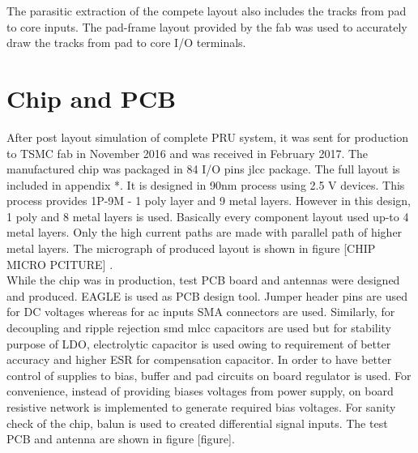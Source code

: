 \documentclass[12pt,a4paper,UKenglish]{article}
\begin{document}
The parasitic extraction of the compete layout also includes the tracks from pad to core inputs. The pad-frame layout provided by the fab was used to accurately draw the tracks from pad to core I/O terminals. \\


\section{Chip and PCB}
After post layout simulation of complete PRU system, it was sent for production to TSMC fab in November 2016 and was received in February 2017. The  manufactured chip was packaged in 84 I/O pins \acrshort{jlcc} package. The full layout is included in appendix *. It is designed in 90nm process using 2.5 V devices. This process provides 1P-9M - 1 poly layer and 9 metal layers. However in this design, 1 poly and 8 metal layers is used. Basically every component layout used up-to 4 metal layers. Only the high current paths are made with parallel path of higher metal layers. The micrograph of produced layout is shown in figure [CHIP MICRO PCITURE] .\\

While the chip was in production, test PCB board and antennas were designed and produced. EAGLE is used as PCB design tool. Jumper header pins are used for DC voltages whereas for ac inputs SMA connectors are used. Similarly, for decoupling and ripple rejection \acrshort{smd} \acrshort{mlcc} capacitors are used but  for stability purpose of LDO, electrolytic capacitor is used owing to requirement of better accuracy and higher ESR for compensation capacitor.  In order to have better control of supplies to bias, buffer and pad circuits on board regulator is used. For convenience, instead of providing biases voltages from power supply, on board resistive network is implemented to generate required bias voltages. For sanity check of the chip, balun is used to created differential signal inputs. The test PCB and antenna are shown in figure [figure].\\



\clearpage
\newpage
\nocite{*}
\printbibliography

\newpage
\listoffigures

\newpage
\listoftables

\newpage
\printnoidxglossaries
\end{document}
